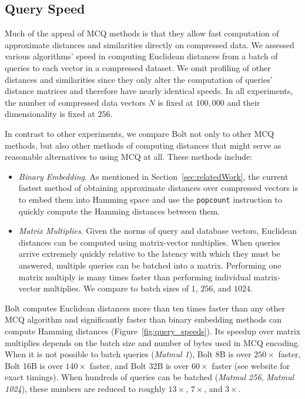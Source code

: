 

\subsection{Query Speed}

Much of the appeal of MCQ methods is that they allow fast computation of approximate distances and similarities directly on compressed data. We assessed various algorithms' speed in computing Euclidean distances from a batch of queries to each vector in a compressed dataset. We omit profiling of other distances and similarities since they only alter the computation of queries' distance matrices and therefore have nearly identical speeds. In all experiments, the number of compressed data vectors $N$ is fixed at $100,000$ and their dimensionality is fixed at $256$.

In contrast to other experiments, we compare Bolt not only to other MCQ methods, but also other methods of computing distances that might serve as reasonable alternatives to using MCQ at all. These methods include:
\begin{itemize}
    \item \textit{Binary Embedding}. As mentioned in Section~\ref{sec:relatedWork}, the current fastest method of obtaining approximate distances over compressed vectors is to embed them into Hamming space and use the \texttt{popcount} instruction to quickly compute the Hamming distances between them.
    \item \textit{Matrix Multiplies}. Given the norms of query and database vectors, Euclidean distances can be computed using matrix-vector multiplies. When queries arrive extremely quickly relative to the latency with which they must be answered, multiple queries can be batched into a matrix. Performing one matrix multiply is many times faster than performing individual matrix-vector multiplies. We compare to batch sizes of $1$, $256$, and $1024$.
\end{itemize}

Bolt computes Euclidean distances more than ten times faster than any other MCQ algorithm and significantly faster than binary embedding methods can compute Hamming distances (Figure~\ref{fig:query_speeds}). Its speedup over matrix multiplies depends on the batch size and number of bytes used in MCQ encoding. When it is not possible to batch queries (\textit{Matmul 1}), Bolt 8B is over $250\times$ faster, Bolt 16B is over $140\times$ faster, and Bolt 32B is over $60\times$ faster (see website for exact timings). When hundreds of queries can be batched (\textit{Matmul 256}, \textit{Matmul 1024}), these numbers are reduced to roughly $13\times$, $7\times$, and $3\times$.

